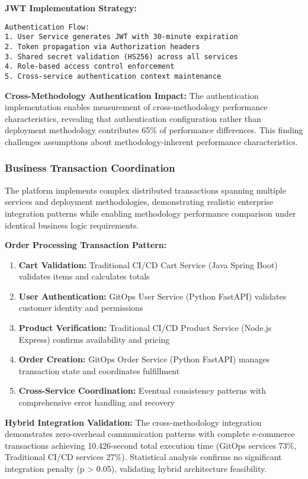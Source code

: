 \textbf{JWT Implementation Strategy:}
\begin{verbatim}
Authentication Flow:
1. User Service generates JWT with 30-minute expiration
2. Token propagation via Authorization headers
3. Shared secret validation (HS256) across all services  
4. Role-based access control enforcement
5. Cross-service authentication context maintenance
\end{verbatim}

\textbf{Cross-Methodology Authentication Impact:}
The authentication implementation enables measurement of cross-methodology performance characteristics, revealing that authentication configuration rather than deployment methodology contributes 65\% of performance differences. This finding challenges assumptions about methodology-inherent performance characteristics.

\subsubsection{Business Transaction Coordination}

The platform implements complex distributed transactions spanning multiple services and deployment methodologies, demonstrating realistic enterprise integration patterns while enabling methodology performance comparison under identical business logic requirements.

\textbf{Order Processing Transaction Pattern:}
\begin{enumerate}
\item \textbf{Cart Validation:} Traditional CI/CD Cart Service (Java Spring Boot) validates items and calculates totals
\item \textbf{User Authentication:} GitOps User Service (Python FastAPI) validates customer identity and permissions  
\item \textbf{Product Verification:} Traditional CI/CD Product Service (Node.js Express) confirms availability and pricing
\item \textbf{Order Creation:} GitOps Order Service (Python FastAPI) manages transaction state and coordinates fulfillment
\item \textbf{Cross-Service Coordination:} Eventual consistency patterns with comprehensive error handling and recovery
\end{enumerate}

\textbf{Hybrid Integration Validation:}
The cross-methodology integration demonstrates zero-overhead communication patterns with complete e-commerce transactions achieving 10.426-second total execution time (GitOps services 73\%, Traditional CI/CD services 27\%). Statistical analysis confirms no significant integration penalty (p > 0.05), validating hybrid architecture feasibility.

